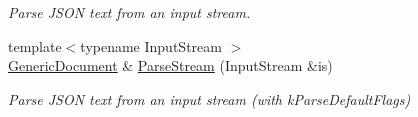 \begin{Indent}
\begin{DoxyCompactItemize}
\begin{DoxyCompactList}\small\item\em Parse J\+S\+ON text from an input stream. \end{DoxyCompactList}\item 
{\footnotesize template$<$typename Input\+Stream $>$ }\\\hyperlink{classGenericDocument}{Generic\+Document} \& \hyperlink{classGenericDocument_abe07ededbe9aaceb0058e3d254892b71}{Parse\+Stream} (Input\+Stream \&is)
\begin{DoxyCompactList}\small\item\em Parse J\+S\+ON text from an input stream (with k\+Parse\+Default\+Flags) \end{DoxyCompactList}\end{DoxyCompactItemize}
\end{Indent}
